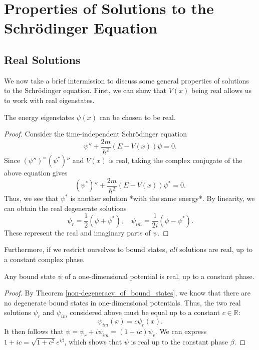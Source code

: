\section{Properties of Solutions to the Schrödinger Equation}

\subsection{Real Solutions}\label{real_solutions}

We now take a brief intermission to discuss some general properties of solutions to the Schrödinger equation. First, we can show that $V(x)$ being real allows us to work with real eigenstates.

\begin{framedthm}\label{real_eigenstates}
    The energy eigenstates $\psi(x)$ can be chosen to be real.

    \begin{proof}
        Consider the time-independent Schrödinger equation $$\psi''+\frac{2m}{\hbar^2}(E-V(x))\psi=0.$$Since $(\psi'')^=(\psi^*)''$ and $V(x)$ is real, taking the complex conjugate of the above equation gives $$(\psi^*)''+\frac{2m}{\hbar^2}(E-V(x))\psi^*=0.$$Thus, we see that $\psi^*$ is another solution *with the same energy*. By linearity, we can obtain the real degenerate solutions $$\psi_r=\frac{1}{2}(\psi+\psi^*),\quad\psi_{im}=\frac{1}{2i}(\psi-\psi^*).$$These represent the real and imaginary parts of $\psi$. 
    \end{proof}
\end{framedthm}

Furthermore, if we restrict ourselves to bound states, \textit{all} solutions are real, up to a constant complex phase.

\begin{framedcor}\label{real_bound_states_cor}

    Any bound state $\psi$ of a one-dimensional potential is real, up to a constant phase.

    \begin{proof} By Theorem \ref{non-degeneracy_of_bound_states}, we know that there are no degenerate bound states in one-dimensional potentials. Thus, the two real solutions $\psi_r$ and $\psi_{im}$ considered above must be equal up to a constant $c\in\mathbb{R}$: $$\psi_{im}(x)=c\psi_r(x).$$It then follows that $\psi=\psi_r+i\psi_{im}=(1+ic)\psi_r$. We can express $1+ic=\sqrt{1+c^2}e^{i\beta}$, which shows that $\psi$ is real up to the constant phase $\beta$. \end{proof}
\end{framedcor}

